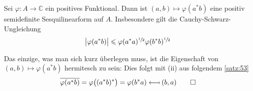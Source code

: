 \begin{proposition}[{name=[positive Sesquilinearformen aus positiven Funktionalen]}]
	Sei $\varphi \colon A \to \mathbb{C}$ ein positives Funktional. Dann ist $(a,b) \mapsto \varphi(a^*b)$ eine positiv semidefinite Sesquilinearform auf $A$.
	Insbesondere gilt die Cauchy-Schwarz-Ungleichung 
	\[
		\abs[\big]{\varphi(a^*b)} \le \varphi(a^*a)^{\sfrac{1}{2}}\varphi(b^*b)^{\sfrac{1}{2}}
	\]
\end{proposition}
\begin{beweis}
	Das einzige, was man sich kurz überlegen muss, ist die Eigenschaft von $(a,b) \mapsto \varphi(a^*b)$ hermitesch zu sein: Dies folgt mit (ii) aus folgendem \autoref{satz:53}
	\[
		\overline{\varphi (a^* b)} = \varphi \enbrace[\big]{(a^*b)^*} = \varphi(b^*a) \mathrel{\reflectbox{\ensuremath{\longmapsto}}} (b,a) \qedhere
	\]
\end{beweis}

